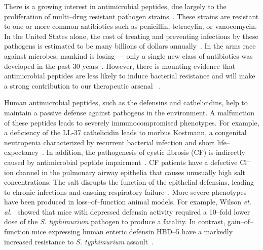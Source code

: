     There is a growing interest in antimicrobial
    peptides, due largely to the proliferation
    of multi--drug resistant pathogen
    strains~\cite{cassell2001development}.  These
    strains are resistant to one or more common
    antibiotics such as penicillin, tetracylin,
    or vanocomycin.  In the United States alone,
    the cost of treating and preventing infections by
    these pathogens is estimated to be many billions of
    dollars annually~\cite{harrison1998antimicrobial}.
    In the arms race against microbes,
    mankind is losing --- only a single new
    class of antibiotics was developed in the
    past 30 years~\cite{normark2002evolution,
    walsh2000molecular}.  However, there is mounting
    evidence that antimicrobial peptides are less
    likely to induce bacterial resistance and will make
    a strong contribution to our therapeutic arsenal
    ~\cite{zasloff2002antimicrobial,zasloff2002antimicrobialpeptides,ge1999invitro}.

    Human antimicrobial peptides, such as
    the defensins and cathelicidins, help to
    maintain a passive defense against pathogens
    in the environment.  A malfunction of these
    peptides leads to severely immunocompromised
    phenotypes.  For example, a deficiency of the
    LL-37 cathelicidin leads to morbus Kostmann,
    a congenital neutropenia characterized
    by recurrent bacterial infection and short
    life--expectancy~\cite{putsep2002deficiency,bowman2003antibacterial}.
    In addition, the pathogenesis of cystic fibrosis
    (CF) is indirectly caused by antimicrobial peptide
    impairment~\cite{ganz2003defensins}.  CF patients
    have a defective Cl$^-$ ion channel in the
    pulmonary airway epithelia that causes unusually
    high salt concentrations.  The salt disrupts the
    function of the epithelial defensins, leading
    to chronic infections and ensuing respiratory
    failure~\cite{smith1996cystic,zasloff2002antimicrobial}.
    More severe phenotypes have been produced in
    loss--of--function animal models.  For example,
    Wilson \emph{et. al.}~\cite{wilson1999regulation}
    showed that mice with depressed defensin
    activity required a 10--fold lower dose
    of the \emph{S. typhimurium} pathogen
    to produce a fatality.  In contrast,
    gain--of--function mice expressing human
    enteric defensin HBD--5 have a markedly
    increased resistance to \emph{S. typhimurium}
    assault~\cite{salzman2003protection}.

